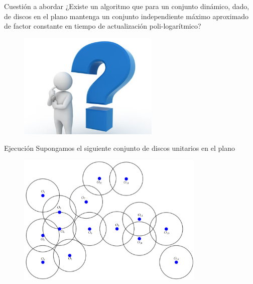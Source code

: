 \begin{frame}{Cuestión a abordar}
  \centering
  ¿Existe un algoritmo que para un conjunto dinámico, dado, de discos en
  el plano mantenga un conjunto independiente máximo aproximado de factor
  constante en tiempo de actualización poli-logarítmico?

  \begin{figure}  
    \centering
    \includegraphics[width=0.6\textwidth]{./Images/autocuestionamiento.jpg}
  \end{figure}
\end{frame}


\begin{frame}{Ejecución}
  Supongamos el siguiente conjunto de discos unitarios en el plano
  \begin{figure}  
    \centering
    \includegraphics[width=0.8\textwidth]{./Images/01.png}
  \end{figure}
\end{frame}

